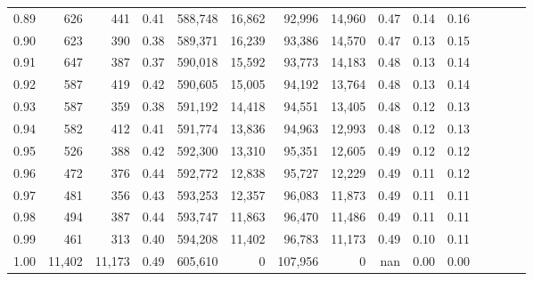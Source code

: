 \begin{tabular}{rrrcrrrrrrrrrrr}
0.89 &     626 &     441 &                                       0.41 &  588,748 &   16,862 &   92,996 &   14,960 &  0.47 &  0.14 &                         0.16 \\
0.90 &     623 &     390 &                                       0.38 &  589,371 &   16,239 &   93,386 &   14,570 &  0.47 &  0.13 &                         0.15 \\
0.91 &     647 &     387 &                                       0.37 &  590,018 &   15,592 &   93,773 &   14,183 &  0.48 &  0.13 &                         0.14 \\
0.92 &     587 &     419 &                                       0.42 &  590,605 &   15,005 &   94,192 &   13,764 &  0.48 &  0.13 &                         0.14 \\
0.93 &     587 &     359 &                                       0.38 &  591,192 &   14,418 &   94,551 &   13,405 &  0.48 &  0.12 &                         0.13 \\
0.94 &     582 &     412 &                                       0.41 &  591,774 &   13,836 &   94,963 &   12,993 &  0.48 &  0.12 &                         0.13 \\
0.95 &     526 &     388 &                                       0.42 &  592,300 &   13,310 &   95,351 &   12,605 &  0.49 &  0.12 &                         0.12 \\
0.96 &     472 &     376 &                                       0.44 &  592,772 &   12,838 &   95,727 &   12,229 &  0.49 &  0.11 &                         0.12 \\
0.97 &     481 &     356 &                                       0.43 &  593,253 &   12,357 &   96,083 &   11,873 &  0.49 &  0.11 &                         0.11 \\
0.98 &     494 &     387 &                                       0.44 &  593,747 &   11,863 &   96,470 &   11,486 &  0.49 &  0.11 &                         0.11 \\
0.99 &     461 &     313 &                                       0.40 &  594,208 &   11,402 &   96,783 &   11,173 &  0.49 &  0.10 &                         0.11 \\
1.00 &  11,402 &  11,173 &                                       0.49 &  605,610 &        0 &  107,956 &        0 &   nan &  0.00 &                         0.00 \\
\bottomrule
\end{tabular}
